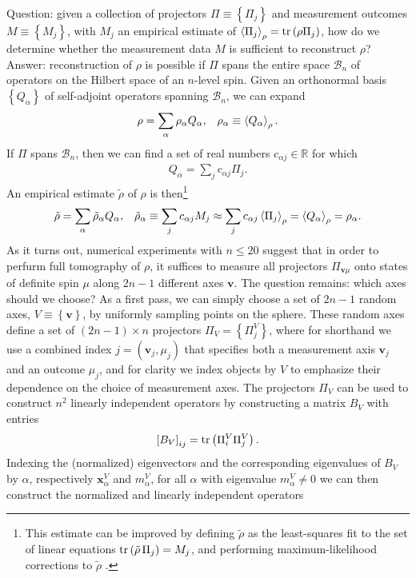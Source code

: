 \documentclass[nofootinbib,notitlepage,11pt]{revtex4-2}
\newcommand{\p}[1]{\left(#1\right)} %
\renewcommand{\sp}[1]{\left[#1\right]} %
\renewcommand{\set}[1]{\left\{#1\right\}} %
\newcommand{\bk}{\Braket} %
\renewcommand{\v}{\bm} %
\newcommand{\1}{\mathds{1}}
\newcommand{\B}{\mathcal{B}}
\newcommand{\RR}{\mathbb{R}}
\begin{document}
Question: given a collection of projectors $\Pi\equiv\set{\Pi_j}$ and measurement outcomes $M\equiv\set{M_j}$, with $M_j$ an empirical estimate of $\bk{\Pi_j}_\rho=\tr\p{\rho\Pi_j}$, how do we determine whether the measurement data $M$ is sufficient to reconstruct $\rho$?
Answer: reconstruction of $\rho$ is possible if $\Pi$ spans the entire space $\B_n$ of operators on the Hilbert space of an $n$-level spin.
Given an orthonormal basis $\set{Q_\alpha}$ of self-adjoint operators spanning $\B_n$, we can expand
\begin{align}
  \rho = \sum_\alpha \rho_\alpha Q_\alpha,
  &&
  \rho_\alpha \equiv \bk{Q_\alpha}_\rho.
\end{align}
If $\Pi$ spans $\B_n$, then we can find a set of real numbers $c_{\alpha j}\in\RR$ for which
\begin{align}
  Q_\alpha = \sum_j c_{\alpha j} \Pi_j.
\end{align}
An empirical estimate $\tilde\rho$ of $\rho$ is then\footnote{This estimate can be improved by defining $\tilde\rho$ as the least-squares fit to the set of linear equations $\tr\p{\tilde\rho\,\Pi_j} = M_j$, and performing maximum-likelihood corrections to $\tilde\rho$ \cite{smolin2012efficient}.}
\begin{align}
  \tilde\rho = \sum_\alpha \tilde\rho_\alpha Q_\alpha,
  &&
  \tilde\rho_\alpha \equiv \sum_j c_{\alpha j} M_j
  \approx \sum_j c_{\alpha j} \bk{\Pi_j}_\rho
  = \bk{Q_\alpha}_\rho
  = \rho_\alpha.
\end{align}
As it turns out, numerical experiments with $n\le20$ suggest that in order to perfurm full tomography of $\rho$, it suffices to measure all projectors $\Pi_{\v v\mu}$ onto states of definite spin $\mu$ along $2n-1$ different axes $\v v$.
The question remains: which axes should we choose?
As a first pass, we can simply choose a set of $2n-1$ random axes, $V\equiv\set{\v v}$, by uniformly sampling points on the sphere.
These random axes define a set of $\p{2n-1}\times n$ projectors $\Pi_V=\set{\Pi^V_j}$, where for shorthand we use a combined index $j=\p{\v v_j,\mu_j}$ that specifies both a measurement axis $\v v_j$ and an outcome $\mu_j$, and for clarity we index objects by $V$ to emphasize their dependence on the choice of measurement axes.
The projectors $\Pi_V$ can be used to construct $n^2$ linearly independent operators by constructing a matrix $B_V$ with entries
\begin{align}
  \sp{B_V}_{ij} = \tr\p{\Pi^V_i \Pi^V_j}.
\end{align}
Indexing the (normalized) eigenvectors and the corresponding eigenvalues of $B_V$ by $\alpha$, respectively $\v x^V_\alpha$ and $m^V_\alpha$, for all $\alpha$ with eigenvalue $m^V_\alpha\ne0$ we can then construct the normalized and linearly independent operators
\end{document}
